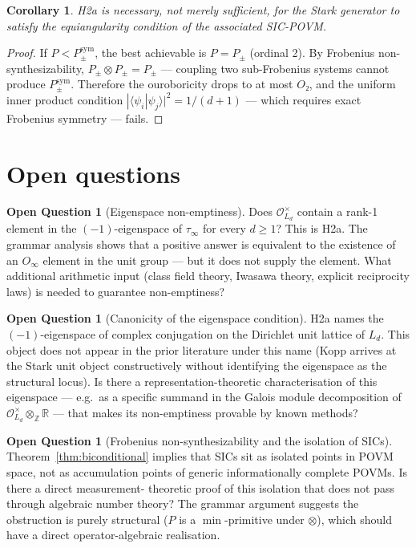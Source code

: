 \documentclass[12pt]{article}
\theoremstyle{plain}
\newtheorem{corollaryinner}[theoreminner]{Corollary}
\theoremstyle{definition}
\newtheorem{questioninner}[theoreminner]{Open Question}
\theoremstyle{remark}
\newenvironment{corollary}{\begin{mdframed}[style=thmstyle]\begin{corollaryinner}}{\end{corollaryinner}\end{mdframed}}
\newenvironment{question}{\begin{mdframed}[style=defstyle]\begin{questioninner}}{\end{questioninner}\end{mdframed}}
\newcommand{\OO}{\mathcal{O}}
\newcommand{\bZ}{\mathbb{Z}}
\newcommand{\bR}{\mathbb{R}}
\newcommand{\tauinf}{\tau_\infty}
\begin{document}
\begin{corollary}
H2a is necessary, not merely sufficient, for the Stark generator to satisfy the equiangularity
condition of the associated SIC-POVM.
\end{corollary}

\begin{proof}
If $P < P_{\pm}^{\text{sym}}$, the best achievable is $P = P_{\pm}$ (ordinal 2). By
Frobenius non-synthesizability, $P_{\pm} \otimes P_{\pm} = P_{\pm}$ — coupling two
sub-Frobenius systems cannot produce $P_{\pm}^{\text{sym}}$. Therefore the ouroboricity drops
to at most $O₂$, and the uniform inner product condition $|\langle \psi_i | \psi_j \rangle|^2
= 1/(d+1)$ — which requires exact Frobenius symmetry — fails.
\end{proof}

\section{Open questions}
\label{sec:openq}

\begin{question}[Eigenspace non-emptiness]
Does $\OO_{L_d}^\times$ contain a rank-1 element in the $(-1)$-eigenspace of $\tauinf$ for
every $d \geq 1$? This is H2a. The grammar analysis shows that a positive answer is equivalent
to the existence of an $O_\infty$ element in the unit group — but it does not supply the element.
What additional arithmetic input (class field theory, Iwasawa theory, explicit reciprocity
laws) is needed to guarantee non-emptiness?
\end{question}

\begin{question}[Canonicity of the eigenspace condition]
H2a names the $(-1)$-eigenspace of complex conjugation on the Dirichlet unit lattice of $L_d$.
This object does not appear in the prior literature under this name (Kopp \cite{kopp2018}
arrives at the Stark unit object constructively without identifying the eigenspace as the
structural locus). Is there a representation-theoretic characterisation of this eigenspace —
e.g.\ as a specific summand in the Galois module decomposition of $\OO_{L_d}^\times \otimes_\bZ
\bR$ — that makes its non-emptiness provable by known methods?
\end{question}

\begin{question}[Frobenius non-synthesizability and the isolation of SICs]
Theorem~\ref{thm:biconditional} implies that SICs sit as isolated points in POVM space, not as
accumulation points of generic informationally complete POVMs. Is there a direct measurement-
theoretic proof of this isolation that does not pass through algebraic number theory? The
grammar argument suggests the obstruction is purely structural ($P$ is a $\min$-primitive under
$\otimes$), which should have a direct operator-algebraic realisation.
\end{question}
\end{document}
